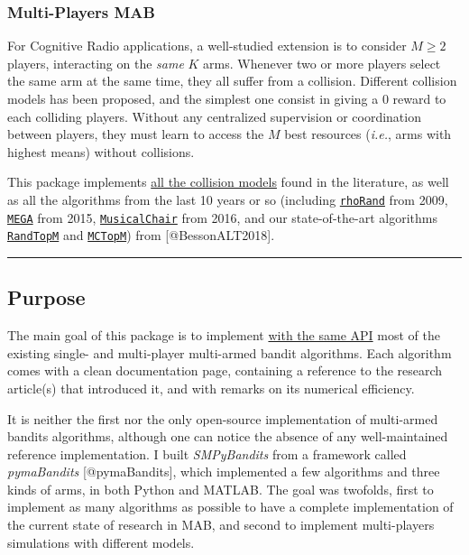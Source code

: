 \hypertarget{multi-players-mab}{%
\subsubsection{Multi-Players MAB}\label{multi-players-mab}}

For Cognitive Radio applications, a well-studied extension is to
consider \(M\geq2\) players, interacting on the \emph{same} \(K\) arms.
Whenever two or more players select the same arm at the same time, they
all suffer from a collision. Different collision models has been
proposed, and the simplest one consist in giving a \(0\) reward to each
colliding players. Without any centralized supervision or coordination
between players, they must learn to access the \(M\) best resources
(\emph{i.e.}, arms with highest means) without collisions.

This package implements
\href{https://smpybandits.github.io/docs/Environment.CollisionModels.html}{all
the collision models} found in the literature, as well as all the
algorithms from the last 10 years or so (including
\href{https://smpybandits.github.io/docs/PoliciesMultiPlayers.rhoRand.html}{\texttt{rhoRand}}
from 2009,
\href{https://smpybandits.github.io/docs/Policies.MEGA.html}{\texttt{MEGA}}
from 2015,
\href{https://smpybandits.github.io/docs/Policies.MusicalChair.html}{\texttt{MusicalChair}}
from 2016, and our state-of-the-art algorithms
\href{https://smpybandits.github.io/docs/PoliciesMultiPlayers.RandTopM.html}{\texttt{RandTopM}}
and
\href{https://smpybandits.github.io/docs/PoliciesMultiPlayers.MCTopM.html}{\texttt{MCTopM}})
from {[}@BessonALT2018{]}.

\begin{center}\rule{0.5\linewidth}{\linethickness}\end{center}

\hypertarget{purpose}{%
\subsection{Purpose}\label{purpose}}

The main goal of this package is to implement
\href{https://smpybandits.github.io/API.html}{with the same API} most of
the existing single- and multi-player multi-armed bandit algorithms.
Each algorithm comes with a clean documentation page, containing a
reference to the research article(s) that introduced it, and with
remarks on its numerical efficiency.

It is neither the first nor the only open-source implementation of
multi-armed bandits algorithms, although one can notice the absence of
any well-maintained reference implementation. I built \emph{SMPyBandits}
from a framework called \emph{pymaBandits} {[}@pymaBandits{]}, which
implemented a few algorithms and three kinds of arms, in both Python and
MATLAB. The goal was twofolds, first to implement as many algorithms as
possible to have a complete implementation of the current state of
research in MAB, and second to implement multi-players simulations with
different models.

